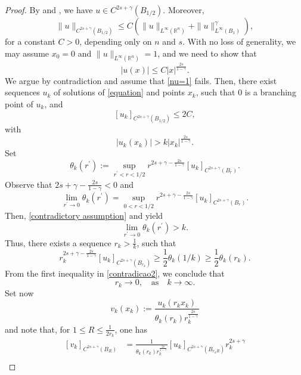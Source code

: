 \documentclass[11pt,reqno]{amsart}
\numberwithin{equation}{section}
\numberwithin{theorem}{section}
\numberwithin{lemma}{section}
\numberwithin{corollary}{section}
\numberwithin{remark}{section}
\numberwithin{proposition}{section}
\numberwithin{definition}{section}
\newcommand{\R}{\mathbb{R}}
\begin{document}
\begin{proof}
By  and , we have $u\in C^{2s+\gamma}(B_{1/2})$. Moreover,
$$
\|u\|_{C^{2s+\gamma}(B_{1/2})}\le C\left(\|u\|_{L^\infty(\R^n)}+\|u\|_{L^\infty(B_1)}^\gamma\right),
$$
for a constant $C>0$, depending only on $n$ and $s$. With no loss of generality, we may assume $x_0=0$ and $\|u\|_{L^\infty(\R^n)}=1$,
and we need to show that
\begin{equation}\label{nu=1}
    |u(x)|\le C|x|^\frac{2s}{1-\gamma}.
\end{equation}
We argue by contradiction and assume that \eqref{nu=1} fails. Then, there exist sequences $u_k$ of solutions of \eqref{equation} and points $x_k$, such that $0$ is a branching point of $u_k$, and
$$
[u_k]_{C^{2s+\gamma}(B_{1/2})}\le2C,
$$
with
\begin{equation}\label{contradictory assumption}
    |u_k(x_k)|>k|x_k|^{\frac{2s}{1-\gamma}}.
\end{equation}
Set 
\begin{equation}\label{definitiontheta}
    \theta_k(r^{\prime} ):=\sup_{r^{\prime} <r<1/2}r^{2s+\gamma-\frac{2s}{1-\gamma}}\left[u_k\right]_{C^{2s+\gamma}(B_r)}.
\end{equation}
Observe that $2s+\gamma-\frac{2s}{1-\gamma}<0$ and
$$
\lim_{r^{\prime}\rightarrow 0}\theta_k(r^{\prime} )=\sup_{0<r<1/2}r^{2s+\gamma-\frac{2s}{1-\gamma}}\left[u_k\right]_{C^{2s+\gamma}(B_r)}.
$$
Then, \eqref{contradictory assumption} and  yield
$$
\lim_{r^{\prime}\rightarrow 0}\theta_k(r^{\prime})>k.
$$
Thus, there exists a sequence $r_k>\frac{1}{k}$, such that
\begin{equation}\label{contradicao2}
r_k^{2s+\gamma-\frac{2s}{1-\gamma}}\left[u_k\right]_{C^{2s+\gamma}(B_{r_k})}\ge\frac{1}{2}\theta_k(1/k)\ge\frac{1}{2}\theta_k(r_k). 
\end{equation}
From the first inequality in \eqref{contradicao2}, we conclude that 
$$
r_k \longrightarrow 0,\quad \textrm{as}\quad k\to\infty.
$$
Set now 
\begin{equation}\label{definitionvk}
    v_k(x_k):=\frac{u_k(r_k x_k)}{\theta_k(r_k)r_k^{\frac{2s}{1-\gamma}}}
\end{equation}
and note that, for $1\le R\le\frac{1}{2r_k}$, one has
\begin{equation}\label{vkestimate}
\begin{split}
    \left[v_k\right]_{C^{2s+\gamma}(B_R)}&=\frac{1}{\theta_k(r_k)r_k^{\frac{2s}{1-\gamma}}}\left[u_k\right]_{C^{2s+\gamma}(B_{r_kR})}r_k^{2s+\gamma}\\

\end{split}
\end{equation}
\end{proof}
\end{document}

